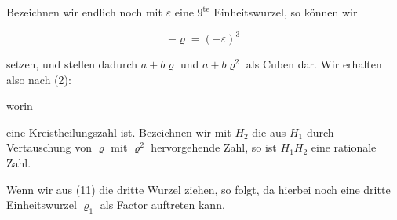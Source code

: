 Bezeichnen wir endlich noch mit $\varepsilon$ eine $9^{\text{te}}$
Einheitswurzel, so können wir

\[
-\varrho = (-\varepsilon)^3
\]

setzen, und stellen dadurch $a+b\varrho$ und $a+b\varrho^2$ als Cuben dar. Wir
erhalten also nach (2):


worin


eine Kreistheilungszahl ist. Bezeichnen wir mit $H_2$ die aus $H_1$ durch
Vertauschung von $\varrho$ mit $\varrho^2$ hervorgehende Zahl, so ist $H_1 H_2$
eine rationale Zahl.

Wenn wir aus (11) die dritte Wurzel ziehen, so folgt, da hierbei noch eine
dritte Einheitswurzel $\varrho_1$ als Factor auftreten kann,

